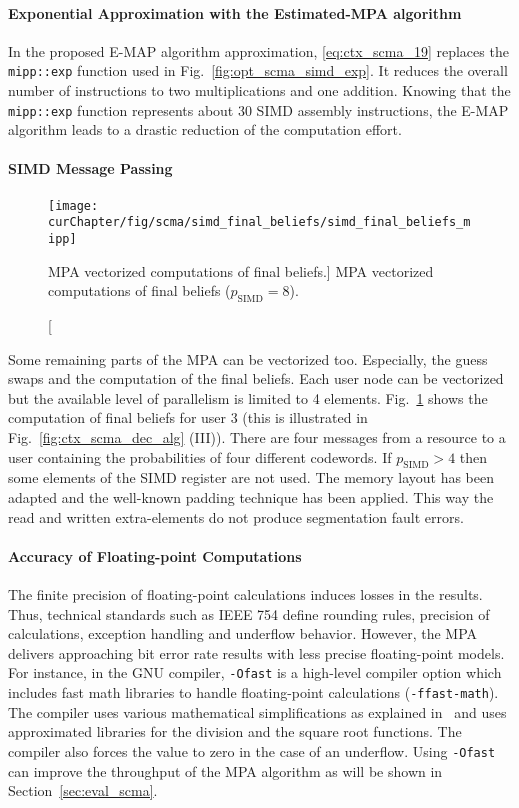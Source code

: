 \paragraph{Exponential Approximation with the Estimated-MPA algorithm}

In the proposed E-MAP algorithm approximation, \eqref{eq:ctx_scma_19} replaces
the \verb|mipp::exp| function used in Fig.~\ref{fig:opt_scma_simd_exp}. It
reduces the overall number of instructions to two multiplications and one
addition. Knowing that the \verb|mipp::exp| function represents about 30 SIMD
assembly instructions, the E-MAP algorithm leads to a drastic reduction of the
computation effort.

\paragraph{SIMD Message Passing}

\begin{figure}[htp]
  \centering
  \texttt{[image: \\curChapter/fig/scma/simd\_final\_beliefs/simd\_final\_beliefs\_mipp]}
  \caption
    [MPA vectorized computations of final beliefs.]
    {MPA vectorized computations of final beliefs ($p_\text{SIMD} = 8$).}
  \label{fig:opt_scma_simd_final_guess}
\end{figure}

Some remaining parts of the MPA can be vectorized too. Especially, the guess
swaps and the computation of the final beliefs. Each user node can be
vectorized but the available level of parallelism is limited to 4 elements.
Fig.~\ref{fig:opt_scma_simd_final_guess} shows the computation of final beliefs
for user 3 (this is illustrated in Fig.~\ref{fig:ctx_scma_dec_alg} (III)).
There are four messages from a resource to a user containing the probabilities
of four different codewords. If $p_\text{SIMD} > 4$ then some elements of the
SIMD register are not used. The memory layout has been adapted and the
well-known padding technique has been applied. This way the read and written
extra-elements do not produce segmentation fault errors.

\paragraph{Accuracy of Floating-point Computations}
\label{sec:opt_scma_float}

The finite precision of floating-point calculations induces losses in the
results. Thus, technical standards such as IEEE 754 define rounding rules,
precision of calculations, exception handling and underflow behavior. However,
the MPA delivers approaching bit error rate results with less precise
floating-point models. For instance, in the GNU compiler, \verb|-Ofast| is a
high-level compiler option which includes fast math libraries to handle
floating-point calculations (\verb|-ffast-math|). The compiler uses various
mathematical simplifications as explained in~\cite{Gccfp2018} and uses
approximated libraries for the division and the square root functions. The
compiler also forces the value to zero in the case of an underflow. Using
\verb|-Ofast| can improve the throughput of the MPA algorithm as will be shown
in Section~\ref{sec:eval_scma}.

